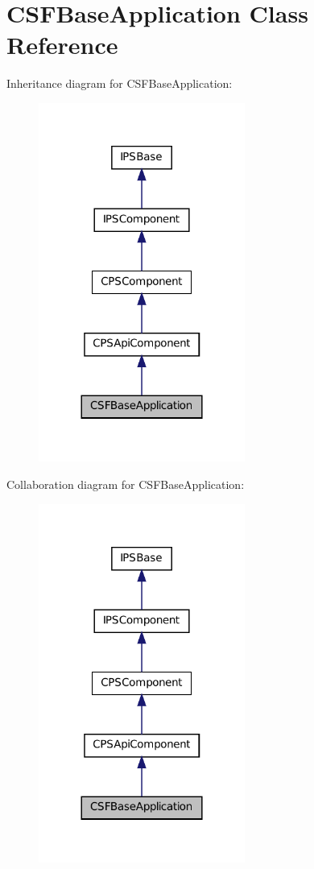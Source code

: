 \hypertarget{classCSFBaseApplication}{
\section{CSFBaseApplication Class Reference}
\label{classCSFBaseApplication}
}


Inheritance diagram for CSFBaseApplication:\nopagebreak
\begin{figure}[H]
\begin{center}
\leavevmode
\includegraphics[width=192pt]{classCSFBaseApplication__inherit__graph}
\end{center}
\end{figure}


Collaboration diagram for CSFBaseApplication:\nopagebreak
\begin{figure}[H]
\begin{center}
\leavevmode
\includegraphics[width=192pt]{classCSFBaseApplication__coll__graph}
\end{center}
\end{figure}
